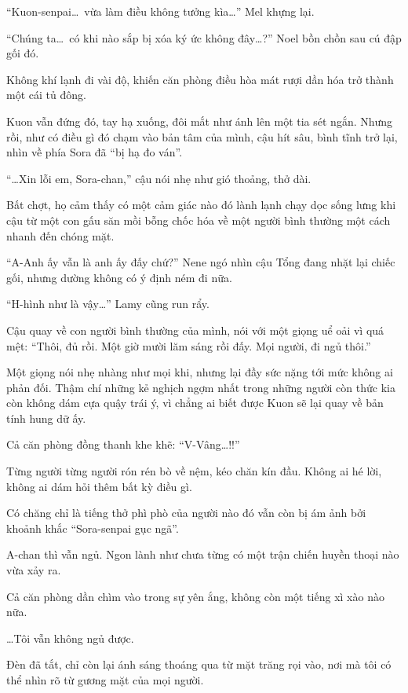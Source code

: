 \documentclass[../main.tex]{subfiles}
\begin{document}
``Kuon-senpai\dots\ vừa làm điều không tưởng kìa\dots'' Mel khựng lại.

``Chúng ta\dots\ có khi nào sắp bị xóa ký ức không đây\dots?'' Noel bồn chồn sau cú đập gối đó.

Không khí lạnh đi vài độ, khiến căn phòng điều hòa mát rượi dần hóa trở thành một cái tủ đông.

Kuon vẫn đứng đó, tay hạ xuống, đôi mắt như ánh lên một tia sét ngắn. Nhưng rồi, như có điều gì đó chạm vào bản tâm của mình, cậu hít sâu, bình tĩnh trở lại, nhìn về phía Sora đã ``bị hạ đo ván''.

``\dots Xin lỗi em, Sora-chan,'' cậu nói nhẹ như gió thoảng, thở dài.

Bất chợt, họ cảm thấy có một cảm giác nào đó lành lạnh chạy dọc sống lưng khi cậu từ một con gấu săn mồi bỗng chốc hóa về một người bình thường một cách nhanh đến chóng mặt.

``A-Anh ấy vẫn là anh ấy đấy chứ?'' Nene ngó nhìn cậu Tổng đang nhặt lại chiếc gối, nhưng dường không có ý định ném đi nữa.

``H-hình như là vậy\dots'' Lamy cũng run rẩy.

Cậu quay về con người bình thường của mình, nói với một giọng uể oải vì quá mệt: ``Thôi, đủ rồi. Một giờ mười lăm sáng rồi đấy. Mọi người, đi ngủ thôi.''

Một giọng nói nhẹ nhàng như mọi khi, nhưng lại đầy sức nặng tới mức không ai phản đối. Thậm chí những kẻ nghịch ngợm nhất trong những người còn thức kia còn không dám cựa quậy trái ý, vì chẳng ai biết được Kuon sẽ lại quay về bản tính hung dữ ấy.

Cả căn phòng đồng thanh khe khẽ: ``V-Vâng\dots!!''

Từng người từng người rón rén bò về nệm, kéo chăn kín đầu. Không ai hé lời, không ai dám hỏi thêm bất kỳ điều gì.

Có chăng chỉ là tiếng thở phì phò của người nào đó vẫn còn bị ám ảnh bởi khoảnh khắc ``Sora-senpai gục ngã''.

A-chan thì vẫn ngủ. Ngon lành như chưa từng có một trận chiến huyền thoại nào vừa xảy ra.

Cả căn phòng dần chìm vào trong sự yên ắng, không còn một tiếng xì xào nào nữa.


\dots Tôi vẫn không ngủ được.

Đèn đã tắt, chỉ còn lại ánh sáng thoáng qua từ mặt trăng rọi vào, nơi mà tôi có thể nhìn rõ từ gương mặt của mọi người.
\end{document}

